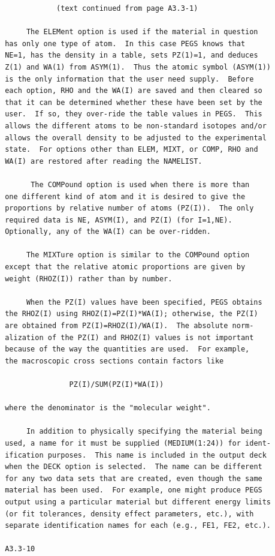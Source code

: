 \newpage {} \begin{verbatim}
             (text continued from page A3.3-1)

      The ELEMent option is used if the material in question
 has only one type of atom.  In this case PEGS knows that
 NE=1, has the density in a table, sets PZ(1)=1, and deduces
 Z(1) and WA(1) from ASYM(1).  Thus the atomic symbol (ASYM(1))
 is the only information that the user need supply.  Before
 each option, RHO and the WA(I) are saved and then cleared so
 that it can be determined whether these have been set by the
 user.  If so, they over-ride the table values in PEGS.  This
 allows the different atoms to be non-standard isotopes and/or
 allows the overall density to be adjusted to the experimental
 state.  For options other than ELEM, MIXT, or COMP, RHO and
 WA(I) are restored after reading the NAMELIST.

       The COMPound option is used when there is more than
 one different kind of atom and it is desired to give the
 proportions by relative number of atoms (PZ(I)).  The only
 required data is NE, ASYM(I), and PZ(I) (for I=1,NE).
 Optionally, any of the WA(I) can be over-ridden.

      The MIXTure option is similar to the COMPound option
 except that the relative atomic proportions are given by
 weight (RHOZ(I)) rather than by number.

      When the PZ(I) values have been specified, PEGS obtains
 the RHOZ(I) using RHOZ(I)=PZ(I)*WA(I); otherwise, the PZ(I)
 are obtained from PZ(I)=RHOZ(I)/WA(I).  The absolute norm-
 alization of the PZ(I) and RHOZ(I) values is not important
 because of the way the quantities are used.  For example,
 the macroscopic cross sections contain factors like

                PZ(I)/SUM(PZ(I)*WA(I))

 where the denominator is the "molecular weight".

      In addition to physically specifying the material being
 used, a name for it must be supplied (MEDIUM(1:24)) for ident-
 ification purposes.  This name is included in the output deck
 when the DECK option is selected.  The name can be different
 for any two data sets that are created, even though the same
 material has been used.  For example, one might produce PEGS
 output using a particular material but different energy limits
 (or fit tolerances, density effect parameters, etc.), with
 separate identification names for each (e.g., FE1, FE2, etc.).

 A3.3-10
\end{verbatim}
